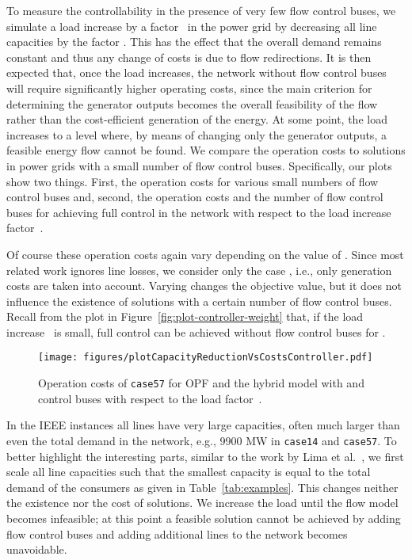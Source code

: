 \documentclass{article}[11pt,a4paper]
\newcommand{\plotscaleOne}{0.45}
\begin{document}
To measure the controllability in the presence of very few flow
control buses, we simulate a load increase by a factor~ in the
power grid by decreasing all line capacities by the factor .
This has the effect that the overall demand remains constant and thus
any change of costs is due to flow redirections.  It is then expected
that, once the load increases, the network without flow control buses
will require significantly higher operating costs, since the main
criterion for determining the generator outputs becomes the overall
feasibility of the flow rather than the cost-efficient generation of
the energy.  At some point, the load increases to a level where, by
means of changing only the generator outputs, a feasible energy flow
cannot be found.  We compare the operation costs to solutions in power
grids with a small number of flow control buses.  Specifically, our
plots show two things.  First, the operation costs for various small
numbers of flow control buses and, second, the operation costs and the
number of flow control buses for achieving full control in the network
with respect to the load increase factor~.

Of course these operation costs again vary depending on the value of
.  Since most related work ignores line losses, we consider
only the case , i.e., only generation costs are taken
into account.  Varying  changes the objective value, but it
does not influence the existence of solutions with a certain number of
flow control buses.  Recall from the plot in
Figure~\ref{fig:plot-controller-weight} that, if the load
increase~ is small, full control can be achieved without flow
control buses for .
\begin{figure}[tb!]
  	\centering
    	\texttt{[image: figures/plotCapacityReductionVsCostsController.pdf]}
	\caption{Operation costs of \texttt{case57} for OPF and the
          hybrid model with  and  control buses with respect to
          the load factor~.}
	\label{fig:plot-capacity-cost-controller}
\end{figure}
In the IEEE instances all lines have very large capacities, often much
larger than even the total demand in the network, e.g., 9900 MW in
\texttt{case14} and \texttt{case57}.  To better highlight the
interesting parts, similar to the work by Lima et
al.~\cite{lgkm-psp-03}, we first scale all line capacities such that
the smallest capacity is equal to the total demand of the consumers as
given in Table~\ref{tab:examples}.  This changes neither the existence
nor the cost of solutions.  We increase the load until the flow model
becomes infeasible; at this point a feasible solution cannot be
achieved by adding flow control buses and adding additional lines to
the network becomes unavoidable.
\end{document}

